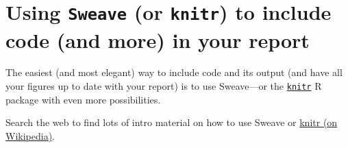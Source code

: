 
\section{Using \texttt{Sweave} (or \texttt{knitr}) to include \Rp code (and more) in your report}
The easiest (and most elegant) way to include \Rp code and its output (and
have all your figures up to date with your report) is to use Sweave---or the
\href{https://cran.R-project.org/package=knitr}{\texttt{knitr}} R package with even more possibilities.

Search the web to find lots of intro material on how to use Sweave or
\href{https://en.wikipedia.org/wiki/Knitr}{knitr (on Wikipedia)}.

